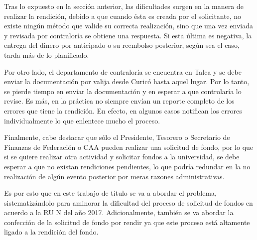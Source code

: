 Tras lo expuesto en la sección anterior, las dificultades surgen en la manera de realizar la rendición, debido a que cuando ésta es creada por el solicitante, no existe ningún método que valide su correcta realización, sino que una vez enviada y revisada por contraloría se obtiene una respuesta. Si esta última es negativa, la entrega del dinero por anticipado o su reembolso posterior, según sea el caso, tarda más de lo planificado.

Por otro lado, el departamento de contraloría se encuentra en Talca y se debe enviar la documentación por valija desde Curicó hasta aquel lugar. Por lo tanto, se pierde tiempo en enviar la documentación y en esperar a que controlaría lo revise. Es más, en la práctica no siempre envían un reporte completo de los errores que tiene la rendición. En efecto, en algunos casos notifican los errores individualmente lo que enlentece mucho el proceso.

Finalmente, cabe destacar que sólo el Presidente, Tesorero o Secretario de Finanzas de Federación o CAA pueden realizar una solicitud de fondo, por lo que si se quiere realizar otra actividad y solicitar fondos a la universidad, se debe esperar a que no existan rendiciones pendientes, lo que podría redundar en la no realización de algún evento posterior por meras razones administrativas.

Es por esto que en este trabajo de título se va a abordar el problema, sistematizándolo para aminorar la dificultad del proceso de solicitud de fondos en acuerdo a la RU N del año 2017. Adicionalmente, también se va abordar la confección de la solicitud de fondo por rendir ya que este proceso está altamente ligado a la rendición del fondo.
